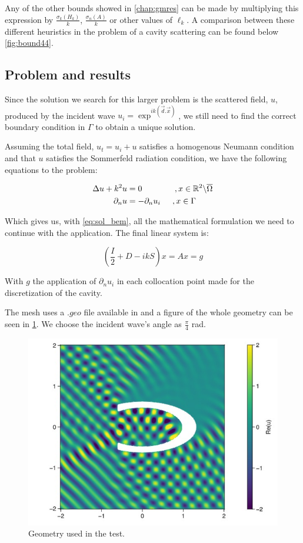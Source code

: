 Any of the other bounds showed in \autoref{chap:gmres} can be made by multiplying this expression by $\frac{\sigma_{k}(H_{k})}{k}$, $\frac{\sigma_{n}(A)}{k}$ or other values of $\ell_{k}$. A comparison between these different heuristics in the problem of a cavity scattering can be found below \ref{fig:bound44}.

\subsection{Problem and results}

Since the solution we search for this larger problem is the scattered field, $u$, produced by the incident wave $u_{i} = \exp^{ik(\vec{d}.\vec{x})}$, we still need to find the correct boundary condition in $\Gamma$ to obtain a unique solution.

Assuming the total field, $u_{t} = u_{i} + u $ satisfies a homogenous Neumann condition and that $u$ satisfies the Sommerfeld radiation condition, we have the following equations to the problem:

\begin{align}\label{eq:cavity_pdes}
    \begin{split}
        \Delta u + k^{2}u &= 0\hspace{0.55in}, x \in \mathbb{R}^{2} \backslash \overline{\Omega} \\
        \partial_{n} u &= -\partial_{n}u_{i}\hspace{0.2in}, x \in \Gamma
    \end{split}
\end{align}

Which gives us, with \ref{eq:sol_bem}, all the mathematical formulation we need to continue with the application. The final linear system is:

\begin{equation}
    \left( \frac{I}{2} + D - ikS \right) x = Ax =g
\end{equation}

With $g$ the application of $\partial_{n} u_{i}$ in each collocation point made for the discretization of the cavity.

The mesh uses a $.geo$ file
available in \cite{git_dudu} and a figure of the whole geometry can be seen in \ref{fig:cavity_fig}. We choose the incident wave's angle as $\frac{\pi}{4}$ rad.

\begin{figure}[h!]
    \centering
    \includegraphics[width=0.5\linewidth]{images/cavity_fig.jpg}
    \caption{Geometry used in the test.}
    \label{fig:cavity_fig}
\end{figure}


